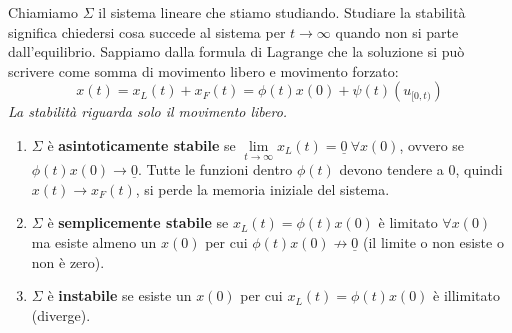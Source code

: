 Chiamiamo $\Sigma $ il sistema lineare che stiamo studiando. Studiare la stabilità significa chiedersi cosa succede al sistema per $t\to \infty $ quando non si parte dall'equilibrio. Sappiamo dalla formula di Lagrange che la soluzione si può scrivere come somma di movimento libero e movimento forzato:
\begin{equation*}
	x\left(t\right) =x_L\left(t\right) +x_F\left(t\right)=\phi (t) x(0) +\psi (t) \left(u_{[ 0,t)}\right)
\end{equation*}
\textit{La stabilità riguarda solo il movimento libero.}
\begin{enumerate}
	\item $\Sigma $ è \textbf{asintoticamente stabile} se $\lim\limits _{t\to \infty } x_L\left(t\right) = \underline{0}\ \forall x\left(0\right)$, ovvero se $\phi \left(t\right) x\left(0\right)\to \underline{0}$. Tutte le funzioni dentro $\phi \left(t\right)$ devono tendere a $0$, quindi $x\left(t\right)\to x_F\left(t\right)$, si perde la memoria iniziale del sistema.
	\item $\Sigma $ è \textbf{semplicemente stabile} se $x_L\left(t\right) =\phi \left(t\right) x\left(0\right)$ è limitato $\forall x\left(0\right)$ ma esiste almeno un $x\left(0\right)$ per cui $\phi \left(t\right) x\left(0\right) \nrightarrow \underline{0}$ (il limite o non esiste o non è zero).
	\item $\Sigma $ è \textbf{instabile} se esiste un $x\left(0\right)$ per cui $x_L\left(t\right) =\phi \left(t\right) x\left(0\right)$ è illimitato (diverge).
\end{enumerate}

